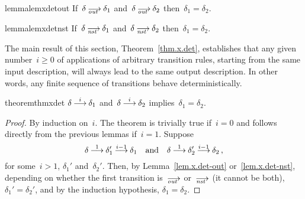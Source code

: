 \begin{restatable}{lemma}{lemxdetout}
  \label{lem.x.det-out}
  If~$\delta\out\delta_1$ and~$\delta\out\delta_2$ then~$\delta_1=\delta_2$.
\end{restatable}

\begin{restatable}{lemma}{lemxdetnst}
  \label{lem.x.det-nst}
  If~$\delta\nst\delta_1$ and~$\delta\nst\delta_2$ then~$\delta_1=\delta_2$.
\end{restatable}

The main result of this section, Theorem~\ref{thm.x.det}, establishes that
any given number~$i\ge0$ of applications of arbitrary transition rules,
starting from the same input description, will always lead to the same
output description.  In other words, any finite sequence of transitions
behave deterministically.

\begin{restatable}[Determinism]{theorem}{thmxdet}
  \label{thm.x.det}
  $\delta\trans[i]\delta_1$ and~$\delta\trans[i]\delta_2$
  implies~$\delta_1=\delta_2$.
\end{restatable}
\begin{proof}
  By induction on~$i$.  The theorem is trivially true if~$i=0$ and follows
  directly from the previous lemmas if~$i=1$.  Suppose
  \[
    \delta\trans[1]\delta_1'\trans[i-1]\delta_1
    \quad\text{and}\quad
    \delta\trans[1]\delta_2'\trans[i-1]\delta_2\,,
  \]
  for some~$i>1$, $\delta_1'$ and~$\delta_2'$.
  Then, by Lemma~\ref{lem.x.det-out} or~\ref{lem.x.det-nst}, depending on
  whether the first transition is~$\out$ or~$\nst$ (it cannot be both),
  $\delta_1'=\delta_2'$, and by the induction hypothesis,
  $\delta_1=\delta_2$.
\end{proof}




